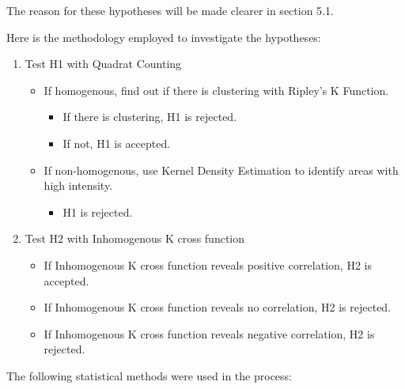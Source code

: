 \documentclass[]{article}
\providecommand{\tightlist}{%
  \setlength{\itemsep}{0pt}\setlength{\parskip}{0pt}}
\theoremstyle{definition}
\theoremstyle{definition}
\theoremstyle{definition}
\theoremstyle{remark}
\begin{document}
The reason for these hypotheses will be made clearer in section 5.1.

Here is the methodology employed to investigate the hypotheses:

\begin{enumerate}
\def\labelenumi{\arabic{enumi}.}
\tightlist
\item
  Test H1 with Quadrat Counting

  \begin{itemize}
  \tightlist
  \item
    If homogenous, find out if there is clustering with Ripley's K
    Function.

    \begin{itemize}
    \tightlist
    \item
      If there is clustering, H1 is rejected.
    \item
      If not, H1 is accepted.
    \end{itemize}
  \item
    If non-homogenous, use Kernel Density Estimation to identify areas
    with high intensity.

    \begin{itemize}
    \tightlist
    \item
      H1 is rejected.
    \end{itemize}
  \end{itemize}
\item
  Test H2 with Inhomogenous K cross function

  \begin{itemize}
  \tightlist
  \item
    If Inhomogenous K cross function reveals positive correlation, H2 is
    accepted.
  \item
    If Inhomogenous K cross function reveals no correlation, H2 is
    rejected.
  \item
    If Inhomogenous K cross function reveals negative correlation, H2 is
    rejected.
  \end{itemize}
\end{enumerate}

The following statistical methods were used in the process:
\end{document}
